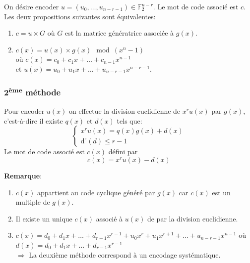\documentclass[a4paper,10pt,twocolumn]{article}
\theoremstyle{break}
\newcommand{\F}{\mathbb{F}}
\newcommand{\FF}{\F_2}
\newcommand{\FFn}[1]{\FF^{#1}}
\newcommand{\dg}[1]{\mathrm{d}^\circ(#1)}
\newenvironment{note}[1]
{\textbf{#1}:}
{}
\newenvironment{remarque}
{\begin{note}{Remarque}}
{\end{note}}
\begin{document}
On désire encoder $u=(u_0, \ldots, u_{n-r-1}) \in \FFn{n-r}$. Le mot de code associé est $c$. 
Les deux propositions suivantes sont équivalentes:
\begin{enumerate}
 \item $c = u \times G$ où $G$ est la matrice génératrice associée à $g(x)$. 
 \item $c(x) = u(x) \times g(x) \mod (x^n-1)$ \\ où $c(x) = c_0 + c_1x + \ldots + c_{n-1}x^{n-1}$ \\
  et $u(x) = u_0 + u_1x + \ldots + u_{n-r-1}x^{n-r-1}$.
\end{enumerate}

\subsubsection{2\textsuperscript{ème} méthode}
Pour encoder $u(x)$ on effectue la division euclidienne de $x^ru(x)$ par $g(x)$, c'est-à-dire 
il existe $q(x)$ et $d(x)$ tels que:
$$ \left \{ \begin{array}{l}
x^r u(x) = q(x)g(x) + d(x) \\
\dg{d} \le r-1
\end{array} \right. $$
Le mot de code associé est $c(x)$ défini par
$$ c(x) = x^r u(x) - d(x)$$

\begin{remarque}
 \begin{enumerate}
  \item $c(x)$ appartient au code cyclique généré par $g(x)$ car $c(x)$ est un multiple de $g(x)$.
  \item Il existe un unique $c(x)$ associé à $u(x)$ de par la division euclidienne.
  \item $c(x) = d_0 + d_1x + \ldots + d_{r-1}x^{r-1} + u_0x^r + u_1x^{r+1} + \ldots + u_{n-r-1}x^{n-1}$
   où $d(x) = d_0 + d_1x + \ldots + d_{r-1}x^{r-1}$ \\
   $\Rightarrow$ La deuxième méthode correspond à un encodage systématique.
 \end{enumerate}
\end{remarque}
\end{document}

